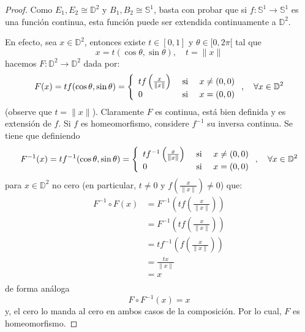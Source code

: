 \documentclass[12pt]{report}
\theoremstyle{largebreak}
\newcommand\cf[3]{\ensuremath{#1:#2\rightarrow#3}}
\begin{document}
    \begin{proof}
        Como $E_1,E_2\cong\mathbb{D}^2$ y $B_1,B_2\cong\mathbb{S}^1$, basta con probar que si $\cf{f}{\mathbb{S}^1}{\mathbb{S}^1}$ es una función continua, esta función puede ser extendida continuamente a $\mathbb{D}^2$.

        En efecto, sea $x\in\mathbb{D}^2$, entonces existe $t\in[0,1]$ y $\theta\in[0,2\pi[$ tal que
        \begin{equation*}
            x=t(\cos\theta,\sin\theta),\quad t=\|x\|
        \end{equation*}
        hacemos $\cf{F}{\mathbb{D}^2}{\mathbb{D}^2}$ dada por:
        \begin{equation*}
            F(x)=tf(\cos\theta,\sin\theta)=\left\{
                \begin{array}{lcr}
                    tf\left(\frac{x}{\|x\|}\right) & \textup{ si } & x\neq(0,0)\\
                    0 & \textup{ si } & x=(0,0)\\
                \end{array}
            \right.,\quad\forall x\in\mathbb{D}^2
        \end{equation*}
        (observe que $t=\|x\|$). Claramente $F$ es continua, está bien definida y es extensión de $f$. Si $f$ es homeomorfismo, considere $f^{-1}$ su inversa continua. Se tiene que definiendo
        \begin{equation*}
            F^{-1}(x)=tf^{-1}(\cos\theta,\sin\theta)=\left\{
                \begin{array}{lcr}
                    tf^{-1}\left(\frac{x}{\|x\|}\right) & \textup{ si } & x\neq(0,0)\\
                    0 & \textup{ si } & x=(0,0)\\
                \end{array}
            \right.,\quad\forall x\in\mathbb{D}^2
        \end{equation*}
        para $x\in\mathbb{D}^2$ no cero (en particular, $t\neq 0$ y $f\left(\frac{x}{\|x\|}\right)\neq0$) que:
        \begin{equation*}
            \begin{split}
                F^{-1}\circ F(x)&=F^{-1}\left(tf\left(\frac{x}{\|x\|}\right)\right)\\
                &=F^{-1}\left(tf\left(\frac{x}{\|x\|}\right)\right)\\
                &=t f^{-1}\left(f\left(\frac{x}{\|x\|}\right)\right)\\
                &=\frac{tx}{\|x\|}\\
                &=x\\
            \end{split}
        \end{equation*}
        de forma análoga
        \begin{equation*}
            F\circ F^{-1}(x)=x
        \end{equation*}
        y, el cero lo manda al cero en ambos casos de la composición. Por lo cual, $F$ es homeomorfismo.
    \end{proof}
\end{document}
